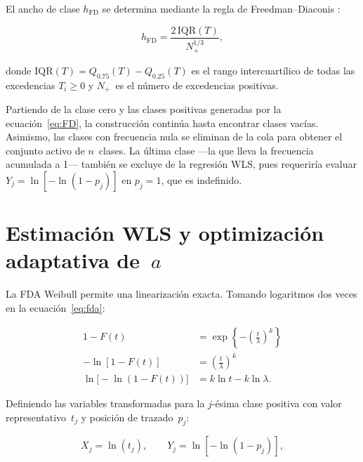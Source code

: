 \documentclass[APA,STIX1COL]{WileyNJD-v2}
\begin{document}
{El ancho de clase $h_{\mathrm{FD}}$ se determina mediante la regla
de Freedman--Diaconis \citep{freedman1981}:

\begin{equation}\label{eq:FD}
h_{\mathrm{FD}}
  = \frac{2\,\mathrm{IQR}(T)}{N_+^{1/3}},
\end{equation}

\medskip

donde $\mathrm{IQR}(T)=Q_{0.75}(T)-Q_{0.25}(T)$ es el rango
intercuart\'ilico de todas las excedencias $T_i\geq 0$ y
$N_+$~es el n\'umero de excedencias positivas.

\medskip

Partiendo de la clase cero y las clases positivas generadas por
la ecuaci\'on~\eqref{eq:FD}, la construcci\'on contin\'ua hasta
encontrar clases vac\'ias. Asimismo, las clases con frecuencia nula se eliminan de la cola para obtener
el conjunto activo de $n$~clases. La \'ultima clase ---la que lleva
la frecuencia acumulada a 1--- tambi\'en se excluye de
la regresi\'on WLS, pues requerir\'ia evaluar
$Y_j=\ln[-\ln(1-p_j)]$ en $p_j=1$, que es indefinido.

\section{Estimaci\'on WLS y optimizaci\'on
         adaptativa de~$a$}\label{sec:estimation}

La FDA Weibull permite una linearización exacta. Tomando logaritmos dos veces en la ecuaci\'on~\eqref{eq:fda}:

\begin{align}
1 - F(t) &= \exp\!\left\{-\!\left(\frac{t}{\lambda}\right)^{\!k}\right\}
  \nonumber\\[4pt]
-\ln[1-F(t)] &= \left(\frac{t}{\lambda}\right)^{\!k}
  \nonumber\\[4pt]
\ln\!\bigl[-\ln(1-F(t))\bigr] &= k\ln t - k\ln\lambda.
  \label{eq:doble_log}
\end{align}

\medskip

Definiendo las variables transformadas para la $j$-\'esima clase positiva
con valor representativo~$t_j$ y posici\'on de trazado~$p_j$:

\begin{equation}\label{eq:XY}
X_j = \ln(t_j),\qquad Y_j = \ln[-\ln(1-p_j)],
\end{equation}

}
\end{document}
